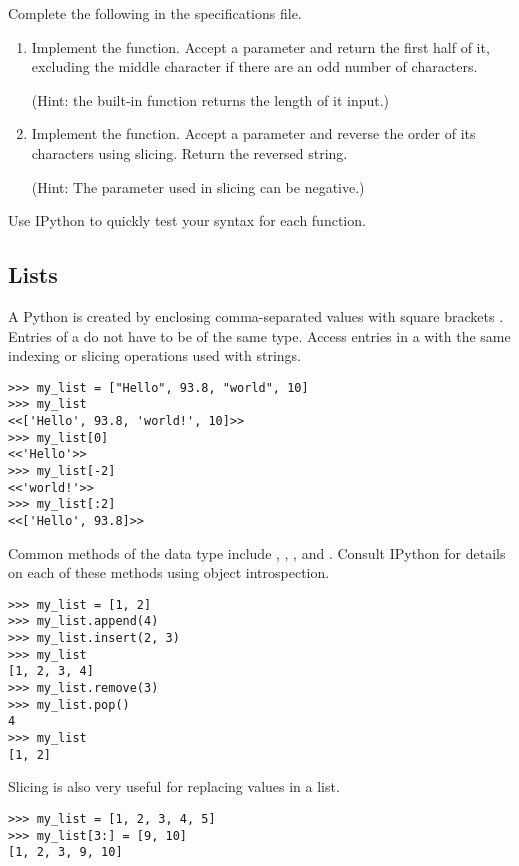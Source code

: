 \begin{problem}
Complete the following in the specifications file.
\begin{enumerate}
\item Implement the  function.
Accept a parameter  and return the first half of it, excluding the middle character if there are an odd number of characters.

(Hint: the built-in  function returns the length of it input.)
\item Implement the  function.
Accept a parameter  and reverse the order of its characters using slicing.
Return the reversed string.

(Hint: The  parameter used in slicing can be negative.)
\end{enumerate}
Use IPython to quickly test your syntax for each function.
\end{problem}


\subsection*{Lists}
A Python  is created by enclosing comma-separated values with square brackets \li{[ ]}.
Entries of a  do not have to be of the same type.
Access entries in a  with the same indexing or slicing operations used with strings.
\begin{lstlisting}
>>> my_list = ["Hello", 93.8, "world", 10]
>>> my_list
<<['Hello', 93.8, 'world!', 10]>>
>>> my_list[0]
<<'Hello'>>
>>> my_list[-2]
<<'world!'>>
>>> my_list[:2]
<<['Hello', 93.8]>>
\end{lstlisting}

Common methods of the  data type include , , , and .
Consult IPython for details on each of these methods using object introspection.
\begin{lstlisting}
>>> my_list = [1, 2]
>>> my_list.append(4)
>>> my_list.insert(2, 3)
>>> my_list
[1, 2, 3, 4]
>>> my_list.remove(3)
>>> my_list.pop()
4
>>> my_list
[1, 2]
\end{lstlisting}

Slicing is also very useful for replacing values in a list.
\begin{lstlisting}
>>> my_list = [1, 2, 3, 4, 5]
>>> my_list[3:] = [9, 10]
[1, 2, 3, 9, 10]
\end{lstlisting}

